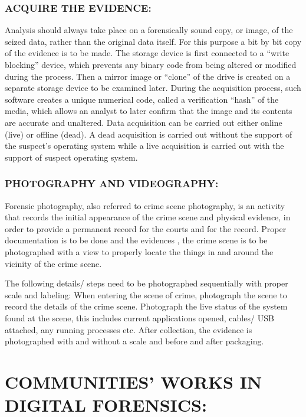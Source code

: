 \documentclass[10pt,british,english]{article}
\begin{document}
\subsubsection{ACQUIRE THE EVIDENCE:}

Analysis should always take place on a forensically sound copy, or
image, of the seized data, rather than the original data itself. For
this purpose a bit by bit copy of the evidence is to be made. The
storage device is first connected to a \textquotedblleft write blocking\textquotedblright{}
device, which prevents any binary code from being altered or modified
during the process. Then a mirror image or \textquotedblleft clone\textquotedblright{}
of the drive is created on a separate storage device to be examined
later. During the acquisition process, such software creates a unique
numerical code, called a verification \textquotedblleft hash\textquotedblright{}
of the media, which allows an analyst to later confirm that the image
and its contents are accurate and unaltered. Data acquisition can
be carried out either online (live) or offline (dead). A dead acquisition
is carried out without the support of the suspect\textquoteright s
operating system while a live acquisition is carried out with the
support of suspect operating system.

\subsubsection{PHOTOGRAPHY AND VIDEOGRAPHY:}

Forensic photography, also referred to crime scene photography, is
an activity that records the initial appearance of the crime scene
and physical evidence, in order to provide a permanent record for
the courts and for the record. Proper documentation is to be done
and the evidences , the crime scene is to be photographed with a view
to properly locate the things in and around the vicinity of the crime
scene.

The following details/ steps need to be photographed sequentially
with proper scale and labeling: When entering the scene of crime,
photograph the scene to record the details of the crime scene. Photograph
the live status of the system found at the scene, this includes current
applications opened, cables/ USB attached, any running processes etc.
After collection, the evidence is photographed with and without a
scale and before and after packaging.

\section{COMMUNITIES\textquoteright{} WORKS IN DIGITAL FORENSICS:}
\end{document}
